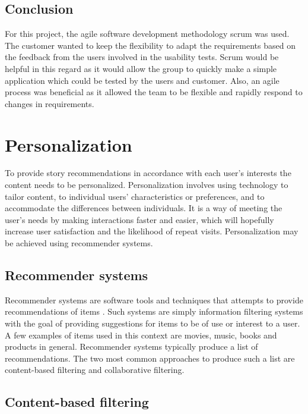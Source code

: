 \subsection{Conclusion}
For this project, the agile software development methodology scrum was used. The customer wanted to keep the flexibility to adapt the requirements based on the feedback from the users involved in the usability tests. Scrum would be helpful in this regard as it would allow the group to quickly make a simple application which could be tested by the users and customer. Also, an agile process was beneficial as it allowed the team to be flexible and rapidly respond to changes in requirements. 

\section{Personalization}
\label{sec:personalization_algorithms}

To provide story recommendations in accordance with each user's interests the content needs to be personalized. Personalization involves using technology to tailor content, to individual users' characteristics or preferences, and to accommodate the differences between individuals. It is a way of meeting the user's needs by making interactions faster and easier, which will hopefully increase user satisfaction and the likelihood of repeat visits. Personalization may be achieved using recommender systems.

\subsection{Recommender systems}

Recommender systems are software tools and techniques that attempts to provide recommendations of items \cite{HM4}. Such systems are simply information filtering systems with the goal of providing suggestions for items to be of use or interest to a user. A few examples of items used in this context are movies, music, books and products in general. Recommender systems typically produce a list of recommendations.  The two most common approaches to produce such a list are content-based filtering and collaborative filtering.

\subsection{Content-based filtering}

